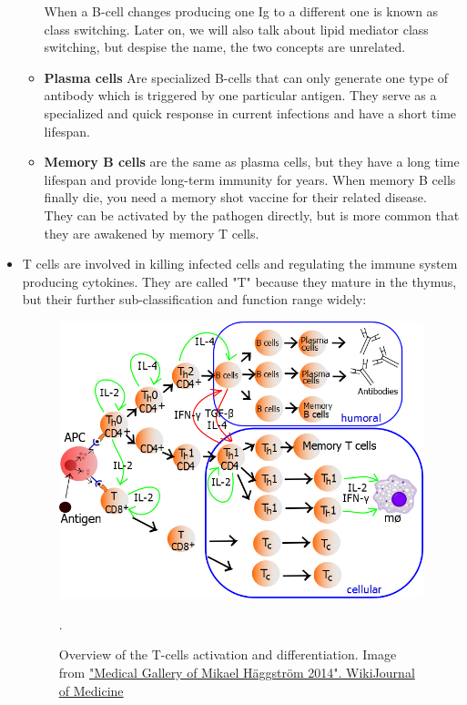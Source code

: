 \begin{itemize}
\begin{itemize}
\begin{itemize}
                \end{itemize}
    
            When a B-cell changes producing one Ig to a different one is known as class switching. Later on, we will also talk about lipid mediator class switching, but despise the name, the two concepts are unrelated.
    
            \item{\textbf{Plasma cells}} Are specialized B-cells that can only generate one type of antibody which is triggered by one particular antigen. They serve as a specialized and quick response in current infections and have a short time lifespan.
        
            \item{\textbf{Memory B cells}} are the same as plasma cells, but they have a long time lifespan and provide long-term immunity for years. When memory B cells finally die, you need a memory shot vaccine for their related disease. They can be activated by the pathogen directly, but is more common that they are awakened by memory T cells.        

        \end{itemize}


        \item {T cells} are involved in killing infected cells and regulating the immune system producing cytokines. They are called "T" because they mature in the thymus, but their further sub-classification and function range widely:

        \begin{figure}[ht]
            \centering
                \includegraphics[width=0.5\linewidth]{figures/Inflammation/Lymphocyte_activation.png} 
            \caption{Overview of the T-cells activation and differentiation. Image from \href{https://en.wikiversity.org/wiki/WikiJournal_of_Medicine/Medical_gallery_of_Mikael_H\%C3\%A4ggstr\%C3\%B6m_2014}{"Medical Gallery of Mikael Häggström 2014". WikiJournal of Medicine}}.
            \label{figure:Thell}
        \end{figure}  
    

\end{itemize}
